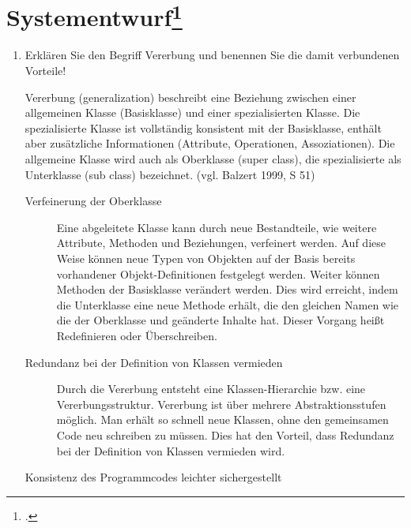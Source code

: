 \documentclass{bschlangaul-aufgabe}
\begin{document}

\section{Systementwurf\footcite[Thema 1 Aufgabe 5]{examen:66112:2006:09}}

\begin{enumerate}


\item Erklären Sie den Begriff Vererbung  und benennen
Sie die damit verbundenen Vorteile!

\begin{liAntwort}
Vererbung (generalization) beschreibt eine Beziehung zwischen einer
allgemeinen Klasse (Basisklasse) und einer spezialisierten Klasse. Die
spezialisierte Klasse ist vollständig konsistent mit der Basisklasse,
enthält aber zusätzliche Informationen (Attribute, Operationen,
Assoziationen). Die allgemeine Klasse wird auch als Oberklasse (super
class), die spezialisierte als Unterklasse (sub class) bezeichnet.
(vgl. Balzert 1999, S 51)


\begin{description}
\item[Verfeinerung der Oberklasse]

Eine abgeleitete Klasse kann durch neue Bestandteile, wie weitere
Attribute, Methoden und Beziehungen, verfeinert werden. Auf diese Weise
können neue Typen von Objekten auf der Basis bereits vorhandener
Objekt-Definitionen festgelegt werden. Weiter können Methoden der
Basisklasse verändert werden. Dies wird erreicht, indem die Unterklasse
eine neue Methode erhält, die den gleichen Namen wie die der Oberklasse
und geänderte Inhalte hat. Dieser Vorgang heißt Redefinieren oder
Überschreiben.

\item[Redundanz bei der Definition von Klassen vermieden]

Durch die Vererbung entsteht eine Klassen-Hierarchie bzw. eine
Vererbungsstruktur. Vererbung ist über mehrere Abstraktionsstufen
möglich. Man erhält so schnell neue Klassen, ohne den gemeinsamen Code
neu schreiben zu müssen. Dies hat den Vorteil, dass Redundanz bei der
Definition von Klassen vermieden wird.

\item[Konsistenz des Programmcodes leichter sichergestellt]


\end{description}
\end{liAntwort}
\end{enumerate}
\end{document}

